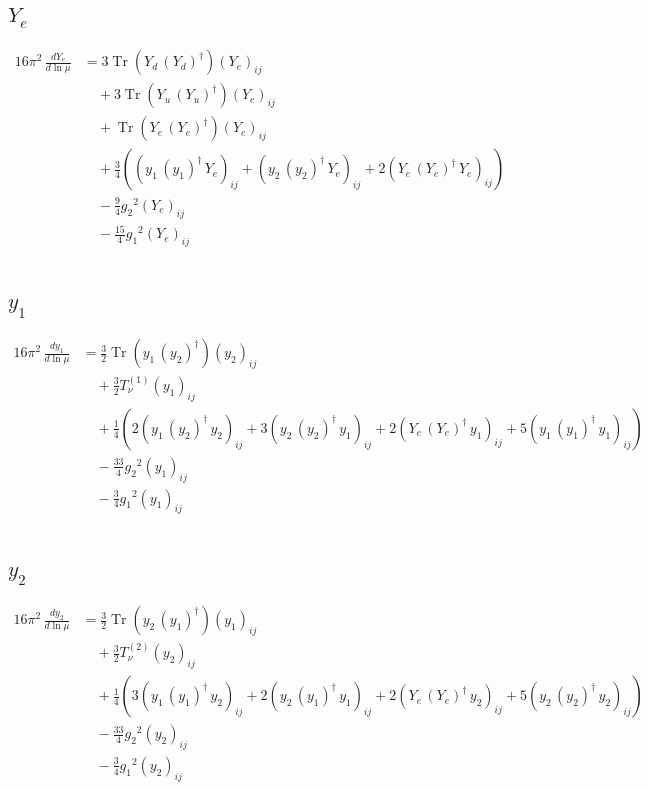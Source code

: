 \documentclass[10pt,a4paper]{article}
\begin{document}
\subsection*{$Y_e$}
\begin{align*}
16\pi^2\,\frac{d Y_e}{d\ln\mu} &=3 \operatorname{Tr}\!\left({Y_d}\,\left({Y_d}\right)^{\dagger}\right) \left({Y_e}\right)_{ij} \\
&\quad +3 \operatorname{Tr}\!\left({Y_u}\,\left({Y_u}\right)^{\dagger}\right) \left({Y_e}\right)_{ij} \\
&\quad +\operatorname{Tr}\!\left({Y_e}\,\left({Y_e}\right)^{\dagger}\right) \left({Y_e}\right)_{ij} \\
&\quad +\frac{3}{4} (\left({y_1}\,\left({y_1}\right)^{\dagger}\,{Y_e}\right)_{ij}+\left({y_2}\,\left({y_2}\right)^{\dagger}\,{Y_e}\right)_{ij}+2 \left({Y_e}\,\left({Y_e}\right)^{\dagger}\,{Y_e}\right)_{ij}) \\
&\quad -\frac{9}{4} {g_2}^2 \left({Y_e}\right)_{ij} \\
&\quad -\frac{15}{4} {g_1}^2 \left({Y_e}\right)_{ij} \\
\end{align*}
\subsection*{$y_1$}
\begin{align*}
16\pi^2\,\frac{d y_1}{d\ln\mu} &=\frac{3}{2} \operatorname{Tr}\!\left({y_1}\,\left({y_2}\right)^{\dagger}\right) \left({y_2}\right)_{ij} \\
&\quad +\frac{3}{2} T_{\nu}^{(1)} \left({y_1}\right)_{ij} \\
&\quad +\frac{1}{4} (2 \left({y_1}\,\left({y_2}\right)^{\dagger}\,{y_2}\right)_{ij}+3 \left({y_2}\,\left({y_2}\right)^{\dagger}\,{y_1}\right)_{ij}+2 \left({Y_e}\,\left({Y_e}\right)^{\dagger}\,{y_1}\right)_{ij}+5 \left({y_1}\,\left({y_1}\right)^{\dagger}\,{y_1}\right)_{ij}) \\
&\quad -\frac{33}{4} {g_2}^2 \left({y_1}\right)_{ij} \\
&\quad -\frac{3}{4} {g_1}^2 \left({y_1}\right)_{ij} \\
\end{align*}
\subsection*{$y_2$}
\begin{align*}
16\pi^2\,\frac{d y_2}{d\ln\mu} &=\frac{3}{2} \operatorname{Tr}\!\left({y_2}\,\left({y_1}\right)^{\dagger}\right) \left({y_1}\right)_{ij} \\
&\quad +\frac{3}{2} T_{\nu}^{(2)} \left({y_2}\right)_{ij} \\
&\quad +\frac{1}{4} (3 \left({y_1}\,\left({y_1}\right)^{\dagger}\,{y_2}\right)_{ij}+2 \left({y_2}\,\left({y_1}\right)^{\dagger}\,{y_1}\right)_{ij}+2 \left({Y_e}\,\left({Y_e}\right)^{\dagger}\,{y_2}\right)_{ij}+5 \left({y_2}\,\left({y_2}\right)^{\dagger}\,{y_2}\right)_{ij}) \\
&\quad -\frac{33}{4} {g_2}^2 \left({y_2}\right)_{ij} \\
&\quad -\frac{3}{4} {g_1}^2 \left({y_2}\right)_{ij} \\
\end{align*}
\end{document}

